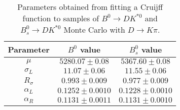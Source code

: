 \begin{table}[h]
  \centering
  \begin{tabular}{ccc}
      \toprule
      Parameter & $B^0$ value & $B^0_s$ value \\
      \midrule
      $\mu$ & $5280.07 \pm 0.08$ & $5367.60 \pm 0.08$ \\
      $\sigma_L$ & $11.07 \pm 0.06$ & $11.55 \pm 0.06$ \\
      $R_\sigma$ & $0.993 \pm 0.009$ & $0.977 \pm 0.009$ \\
      $\alpha_L$ & $0.1252 \pm 0.0010$ & $0.1228 \pm 0.0010$ \\
      $\alpha_R$ & $0.1131 \pm 0.0011$ & $0.1131 \pm 0.0010$ \\
  \bottomrule
  \end{tabular}
  \caption{Parameters obtained from fitting a Cruijff function to samples of $B^0 \to DK^{*0}$ and $B^0_s \to DK^{*0}$ Monte Carlo  with $D \to K\pi$.}
\label{tab:signal_MC_params}
\end{table}
